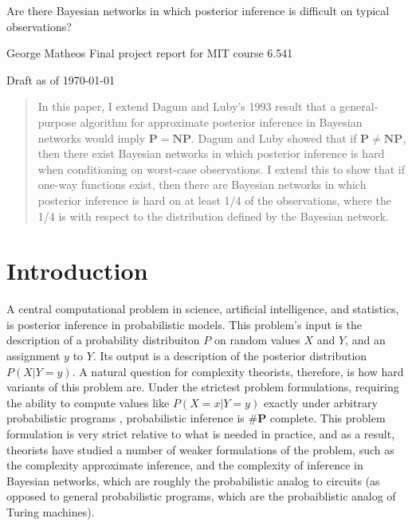 \documentclass{article}
\renewcommand{\P}{\mathbf{P}}
\newcommand{\NP}{\mathbf{NP}}
\theoremstyle{definition}
\theoremstyle{remark}
\begin{document}
\begin{center}
    \Large
    Are there Bayesian networks in which posterior inference is difficult on typical observations?

    \vspace{3pt}
    \normalsize
    George Matheos \quad \vline \quad Final project report for MIT course 6.541

    \vspace{3pt}
    Draft as of \today
\end{center}

\begin{abstract}
In this paper, I extend Dagum and Luby's 1993 result \cite{dagum1993} that a general-purpose algorithm for approximate posterior inference in Bayesian networks would imply $\P = \NP$.
Dagum and Luby showed that if $\P \neq \NP$, then there exist Bayesian networks in which posterior inference is hard when conditioning on worst-case observations.
I extend this to show that if one-way functions exist, then
there are Bayesian networks in which posterior inference is hard on at least 1/4 of the observations, where the 1/4 is with respect to the distribution defined by the Bayesian network.
\end{abstract}

\section{Introduction}
A central computational problem in science, artificial intelligence, and statistics, is posterior inference in probabilistic models.
This problem's input is the description of a probability distribuiton $P$ on random values $X$ and $Y$, and an assignment $y$ to $Y$.
Its output is a description of the posterior distribution $P(X | Y = y)$.
A natural question for complexity theorists, therefore, is how hard variants of this problem are.
Under the strictest problem formulations, requiring the ability to compute values like $P(X = x | Y = y)$ exactly under arbitrary probabilistic programs \cite{}, probabilistic inference is $\#\P$ complete.
This problem formulation is very strict relative to what is needed in practice, and as a result, theorists have studied a number of weaker formulations of the problem, such as the complexity approximate inference, and the complexity of inference in Bayesian networks, which are roughly the probabilistic analog to circuits (as opposed to general probabilistic programs, which are the probaiblistic analog of Turing machines).
\end{document}
